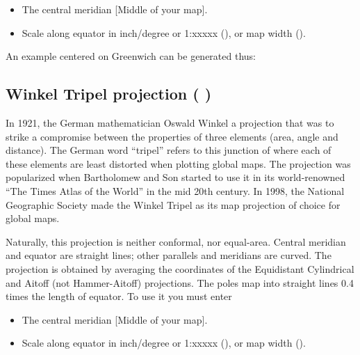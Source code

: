 \begin{itemize} 
\item The central meridian [Middle of your map].
\item Scale along equator in inch/degree or 1:xxxxx (), or map width ().
\end{itemize} 

An example centered on Greenwich can be generated thus:

\clearpage



\subsection{Winkel Tripel projection ( )}


In 1921, the German mathematician Oswald Winkel a projection that was to strike a compromise between the properties of three elements (area, angle and distance). The German word ``tripel'' refers to this junction of where each of these elements are least distorted when plotting global maps. The projection was popularized when Bartholomew and Son started to use it in its world-renowned ``The Times Atlas of the World'' in the mid 20th century. In 1998, the National Geographic Society made the Winkel Tripel as its map projection of choice for global maps. 

Naturally, this projection is neither conformal, nor equal-area. Central meridian and equator are
straight lines; other parallels and meridians are curved.
The projection is obtained by averaging the coordinates of
the Equidistant Cylindrical and Aitoff (not Hammer-Aitoff)
projections.  The poles map into straight lines 0.4 times
the length of equator.  To use it you must enter

\begin{itemize} 
\item The central meridian [Middle of your map].
\item Scale along equator in inch/degree or 1:xxxxx (), or map width ().
\end{itemize} 

